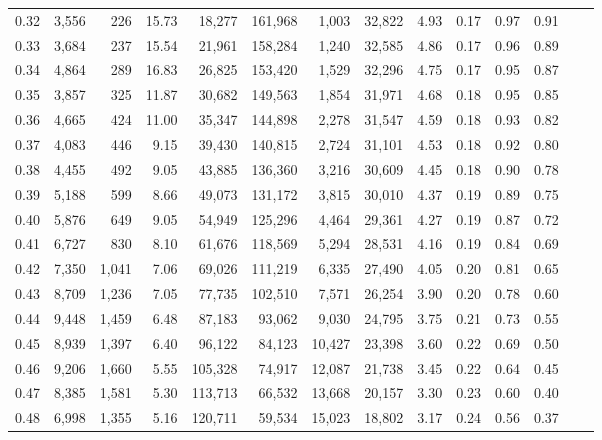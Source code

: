 \begin{tabular}{rrrrrrrrrrrrrr}
0.32 &  3,556 &    226 &   15.73 &   18,277 &  161,968 &   1,003 &  32,822 &  4.93 &  0.17 &  0.97 &      0.91 \\
0.33 &  3,684 &    237 &   15.54 &   21,961 &  158,284 &   1,240 &  32,585 &  4.86 &  0.17 &  0.96 &      0.89 \\
0.34 &  4,864 &    289 &   16.83 &   26,825 &  153,420 &   1,529 &  32,296 &  4.75 &  0.17 &  0.95 &      0.87 \\
0.35 &  3,857 &    325 &   11.87 &   30,682 &  149,563 &   1,854 &  31,971 &  4.68 &  0.18 &  0.95 &      0.85 \\
0.36 &  4,665 &    424 &   11.00 &   35,347 &  144,898 &   2,278 &  31,547 &  4.59 &  0.18 &  0.93 &      0.82 \\
0.37 &  4,083 &    446 &    9.15 &   39,430 &  140,815 &   2,724 &  31,101 &  4.53 &  0.18 &  0.92 &      0.80 \\
0.38 &  4,455 &    492 &    9.05 &   43,885 &  136,360 &   3,216 &  30,609 &  4.45 &  0.18 &  0.90 &      0.78 \\
0.39 &  5,188 &    599 &    8.66 &   49,073 &  131,172 &   3,815 &  30,010 &  4.37 &  0.19 &  0.89 &      0.75 \\
0.40 &  5,876 &    649 &    9.05 &   54,949 &  125,296 &   4,464 &  29,361 &  4.27 &  0.19 &  0.87 &      0.72 \\
0.41 &  6,727 &    830 &    8.10 &   61,676 &  118,569 &   5,294 &  28,531 &  4.16 &  0.19 &  0.84 &      0.69 \\
0.42 &  7,350 &  1,041 &    7.06 &   69,026 &  111,219 &   6,335 &  27,490 &  4.05 &  0.20 &  0.81 &      0.65 \\
0.43 &  8,709 &  1,236 &    7.05 &   77,735 &  102,510 &   7,571 &  26,254 &  3.90 &  0.20 &  0.78 &      0.60 \\
0.44 &  9,448 &  1,459 &    6.48 &   87,183 &   93,062 &   9,030 &  24,795 &  3.75 &  0.21 &  0.73 &      0.55 \\
0.45 &  8,939 &  1,397 &    6.40 &   96,122 &   84,123 &  10,427 &  23,398 &  3.60 &  0.22 &  0.69 &      0.50 \\
0.46 &  9,206 &  1,660 &    5.55 &  105,328 &   74,917 &  12,087 &  21,738 &  3.45 &  0.22 &  0.64 &      0.45 \\
0.47 &  8,385 &  1,581 &    5.30 &  113,713 &   66,532 &  13,668 &  20,157 &  3.30 &  0.23 &  0.60 &      0.40 \\
0.48 &  6,998 &  1,355 &    5.16 &  120,711 &   59,534 &  15,023 &  18,802 &  3.17 &  0.24 &  0.56 &      0.37 \\

\end{tabular}
